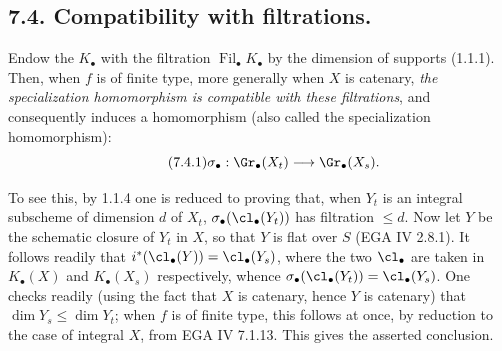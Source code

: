 \subsection*{7.4. Compatibility with filtrations.}
Endow the \(K_\bullet\) with the filtration \(\operatorname{Fil}_\bullet K_\bullet\) by the dimension of supports (1.1.1). Then, when \(f\) is of finite type, more generally when \(X\) is catenary, \emph{the specialization homomorphism is compatible with these filtrations}, and consequently induces a homomorphism (also called the specialization homomorphism):
\begin{equation}\tag{7.4.1}
  \sigma_\bullet:\Gr_\bullet(X_t)\longrightarrow \Gr_\bullet(X_s).
\end{equation}

To see this, by 1.1.4 one is reduced to proving that, when \(Y_t\) is an integral subscheme of dimension \(d\) of \(X_t\), \(\sigma_\bullet(\cl_\bullet(Y_t))\) has filtration \(\leq d\). Now let \(Y\) be the schematic closure of \(Y_t\) in \(X\), so that \(Y\) is flat over \(S\) (EGA IV 2.8.1). It follows readily that \(i^*(\cl_\bullet(Y))=\cl_\bullet(Y_s)\), where the two \(\cl_\bullet\) are taken in \(K_\bullet(X)\) and \(K_\bullet(X_s)\) respectively, whence \(\sigma_\bullet(\cl_\bullet(Y_t))=\cl_\bullet(Y_s)\). One checks readily (using the fact that \(X\) is catenary, hence \(Y\) is catenary) that \(\dim Y_s\leq \dim Y_t\); when \(f\) is of finite type, this follows at once, by reduction to the case of integral \(X\), from EGA IV 7.1.13. This gives the asserted conclusion.

%

